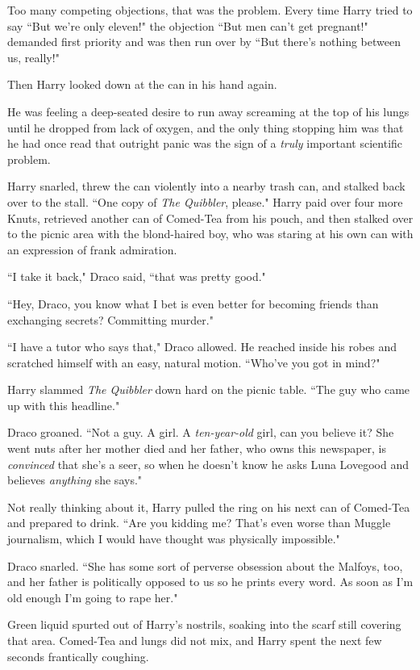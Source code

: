 Too many competing objections, that was the problem. Every time Harry tried to say ``But we're only eleven!" the objection ``But men can't get pregnant!" demanded first priority and was then run over by ``But there's nothing between us, really!"

Then Harry looked down at the can in his hand again.

He was feeling a deep-seated desire to run away screaming at the top of his lungs until he dropped from lack of oxygen, and the only thing stopping him was that he had once read that outright panic was the sign of a \emph{truly} important scientific problem.

Harry snarled, threw the can violently into a nearby trash can, and stalked back over to the stall. ``One copy of \emph{The Quibbler}, please." Harry paid over four more Knuts, retrieved another can of Comed-Tea from his pouch, and then stalked over to the picnic area with the blond-haired boy, who was staring at his own can with an expression of frank admiration.

``I take it back," Draco said, ``that was pretty good."

``Hey, Draco, you know what I bet is even better for becoming friends than exchanging secrets? Committing murder."

``I have a tutor who says that," Draco allowed. He reached inside his robes and scratched himself with an easy, natural motion. ``Who've you got in mind?"

Harry slammed \emph{The Quibbler} down hard on the picnic table. ``The guy who came up with this headline."

Draco groaned. ``Not a guy. A girl. A \emph{ten-year-old} girl, can you believe it? She went nuts after her mother died and her father, who owns this newspaper, is \emph{convinced} that she's a seer, so when he doesn't know he asks Luna Lovegood and believes \emph{anything} she says."

Not really thinking about it, Harry pulled the ring on his next can of Comed-Tea and prepared to drink. ``Are you kidding me? That's even worse than Muggle journalism, which I would have thought was physically impossible."

Draco snarled. ``She has some sort of perverse obsession about the Malfoys, too, and her father is politically opposed to us so he prints every word. As soon as I'm old enough I'm going to rape her."

Green liquid spurted out of Harry's nostrils, soaking into the scarf still covering that area. Comed-Tea and lungs did not mix, and Harry spent the next few seconds frantically coughing.

